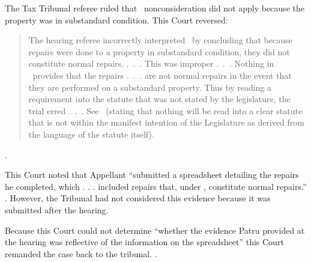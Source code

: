 \documentclass[12pt,\documentclassflag]{michiganCourtOfAppealsBrief}
\begin{document}
The Tax Tribunal referee ruled that \mathieuGast\ nonconsideration did not apply because the property was in substandard condition.
This Court reversed:

\begin{quote}
  The hearing referee incorrectly interpreted \mathieuGast\ by concluding that because repairs were done to a property in substandard condition, they did not constitute normal repairs. .~.~. This was improper .~.~. Nothing in \mathieuGast\ provides that the repairs .~.~. are not normal repairs in the event that they are performed on a substandard property. Thus by reading a requirement into the statute that was not stated by the legislature, the trial erred .~.~. See \ (stating that nothing will be read into a clear statute that is not within the manifest intention of the Legislature as derived from the language of the statute itself).
\end{quote}
.

This Court noted that Appellant ``submitted a spreadsheet detailing the repairs he completed, which . . . included repairs that, under \mathieuGast, constitute normal repairs.'' .
However, the Tribunal had not considered this evidence because it was submitted after the hearing.

Because this Court could not determine ``whether the evidence Patru provided at the hearing was reflective of the information on the spreadsheet'' this Court remanded the case back to the tribunal. .

\end{document}
